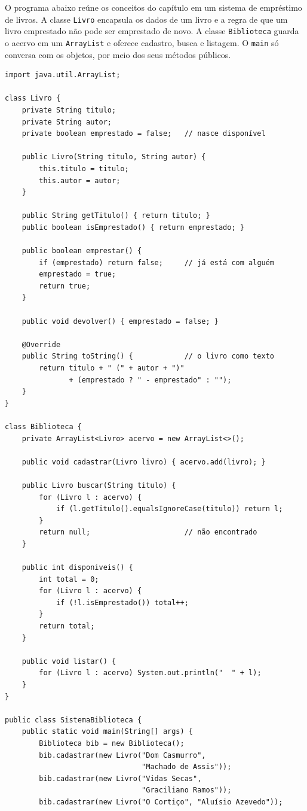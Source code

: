 O programa abaixo reúne os conceitos do capítulo em um sistema de empréstimo de livros. A classe \texttt{Livro} encapsula os dados de um livro e a regra de que um livro emprestado não pode ser emprestado de novo. A classe \texttt{Biblioteca} guarda o acervo em um \texttt{ArrayList} e oferece cadastro, busca e listagem. O \texttt{main} só conversa com os objetos, por meio dos seus métodos públicos.

\begin{codigo}
\begin{Verbatim}[breaklines=true, breaksymbolleft={}, fontsize=\footnotesize]
import java.util.ArrayList;

class Livro {
    private String titulo;
    private String autor;
    private boolean emprestado = false;   // nasce disponível

    public Livro(String titulo, String autor) {
        this.titulo = titulo;
        this.autor = autor;
    }

    public String getTitulo() { return titulo; }
    public boolean isEmprestado() { return emprestado; }

    public boolean emprestar() {
        if (emprestado) return false;     // já está com alguém
        emprestado = true;
        return true;
    }

    public void devolver() { emprestado = false; }

    @Override
    public String toString() {            // o livro como texto
        return titulo + " (" + autor + ")"
               + (emprestado ? " - emprestado" : "");
    }
}

class Biblioteca {
    private ArrayList<Livro> acervo = new ArrayList<>();

    public void cadastrar(Livro livro) { acervo.add(livro); }

    public Livro buscar(String titulo) {
        for (Livro l : acervo) {
            if (l.getTitulo().equalsIgnoreCase(titulo)) return l;
        }
        return null;                      // não encontrado
    }

    public int disponiveis() {
        int total = 0;
        for (Livro l : acervo) {
            if (!l.isEmprestado()) total++;
        }
        return total;
    }

    public void listar() {
        for (Livro l : acervo) System.out.println("  " + l);
    }
}

public class SistemaBiblioteca {
    public static void main(String[] args) {
        Biblioteca bib = new Biblioteca();
        bib.cadastrar(new Livro("Dom Casmurro",
                                "Machado de Assis"));
        bib.cadastrar(new Livro("Vidas Secas",
                                "Graciliano Ramos"));
        bib.cadastrar(new Livro("O Cortiço", "Aluísio Azevedo"));


\end{Verbatim}
\end{codigo}
